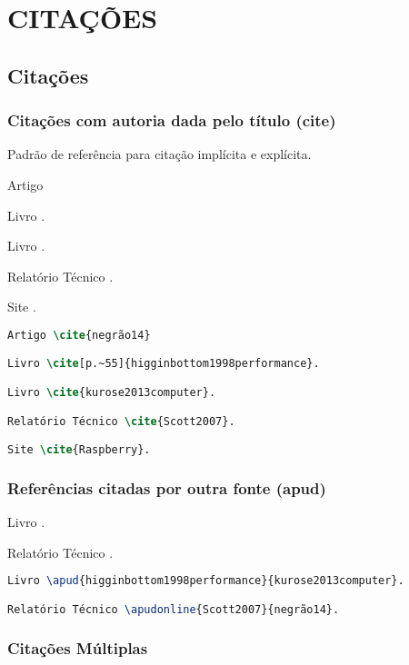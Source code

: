 \chapter{CITAÇÕES}
\label{sec:citacoes}

\section{Citações}
    \subsection{Citações com autoria dada pelo título (cite) }

    Padrão de referência para citação implícita e explícita.
    
    Artigo \cite{negrão14}
    
    Livro \cite[p.~55]{higginbottom1998performance}.
    
    Livro \cite{kurose2013computer}.
    
    Relatório Técnico \cite{Scott2007}.
    
    Site \cite{Raspberry}.

\begin{lstlisting}[language=TeX, caption={citação1}]
Artigo \cite{negrão14}

Livro \cite[p.~55]{higginbottom1998performance}.

Livro \cite{kurose2013computer}.

Relatório Técnico \cite{Scott2007}.

Site \cite{Raspberry}.    
\end{lstlisting}

   \subsection{Referências citadas por outra fonte (apud)}
    
    Livro .
    
    Relatório Técnico .

\begin{lstlisting}[language=TeX, caption={citação2}]
Livro \apud{higginbottom1998performance}{kurose2013computer}.

Relatório Técnico \apudonline{Scott2007}{negrão14}.
\end{lstlisting}

   \subsection{Citações Múltiplas}
    
